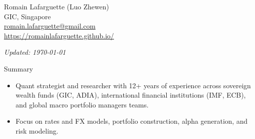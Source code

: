 \documentclass[usegeometry, 10pt, a4paper]{cv} %
\begin{document}
\hspace{10mm}
\begin{chapeau}
\begin{adresse}
\begin{flushleft}
    Romain Lafarguette (Luo Zhewen)\\
    GIC, Singapore \\
    \href{mailto:romain.lafarguette@gmail.com}{romain.lafarguette@gmail.com}\\
    \url{https://romainlafarguette.github.io/} \\
\end{flushleft}
\end{adresse}
\begin{etatcivil}
\begin{flushleft}
  \hspace{15mm} \emph{Updated: \monthyeardate\today}\\
\end{flushleft}
\end{etatcivil}
\end{chapeau}

\begin{rubriquetableau}[0.95\textwidth]{Summary}\\
  \vspace{-1cm}
  \begin{itemize}
    \item Quant strategist and researcher with 12+ years of experience across sovereign wealth funds (GIC, ADIA), international financial institutions (IMF, ECB), and global macro portfolio managers teams.
    \item Focus on rates and FX models, portfolio construction, alpha generation, and risk modeling.
  \end{itemize}

\end{rubriquetableau}

\vspace{0.2cm}

\end{document}

